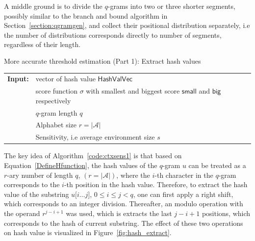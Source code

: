 \documentclass[twoside,a4paper,bsc]{master}
\newcommand{\Qgram}[1]{\(#1\)-gram}
\newcommand{\Append}[0]{\mathsf{append}}
\newcommand{\HashValue}[0]{\mathsf{HashValue}}
\newcommand{\HashValVec}[0]{\mathsf{HashValVec}}
\newcommand{\Small}[0]{\mathsf{small}}
\newcommand{\Biggg}[0]{\mathsf{big}}
\newcommand{\DivFactors}[0]{\mathsf{divFactors}}
\newcommand{\DivFactor}[0]{\mathsf{divFactor}}
\newcommand{\ModFactors}[0]{\mathsf{modFactors}}
\newcommand{\Subchar}[2]{#1\lbrack #2\rbrack}
\newcommand{\Alpha}[0]{\mathcal{A}}
\newcommand{\Qsplit}{\mathsf{QS}}
\begin{document}
A middle ground is to divide the \Qgram{q}s
into two or three shorter segments, possibly similar to the branch and
bound
algorithm in Section~\ref{section:qgramgen}, and collect their positional
distribution separately, i.e the number of distributions corresponds
directly to
number of segments, regardless of their length.

\begin{algorithm}[t]
\caption{More accurate threshold estimation (Part 1): Extract hash values}
\label{code:ctxsens1}
\begin{tabular}{@{}l@{~}l}
\textbf{Input:}&vector of hash value \(\HashValVec\)\\
&score function \(\sigma\) with smallest and biggest score \(\Small\) and
\(\Biggg\)
respectively\\
&\Qgram{q} length \(q\)\\
&Alphabet size \(r = |\Alpha|\)\\
&Sensitivity, i.e average environment size \(s\)
\end{tabular}
\begin{algorithmic}
\State \(\ModFactors \gets []\)
\State \(\DivFactors \gets []\)
\For{\(i\in[0,|\Qsplit(q)|)\)}
\State \(\ModFactors.\Append(r^{\Qsplit(q)[i]})\)
\State \(\DivFactor \gets 1\)
\For{\(j\in[i+1,|\Qsplit(q)|)\)}
\State \(\DivFactor\text{ \(\cdot\)= }\Qsplit(q)[j]\)
\EndFor
\State \(\DivFactors.\Append(\DivFactor)\)
\EndFor
\State \(d \gets []\)
\For{\(i\in[0,|\Qsplit(q)|)\)}\Comment{Extract hash values of segments}
\State \(d.\Append([0] \times \ModFactors[i])\)
\EndFor
\For{\(\HashValue\in\HashValVec\)}
\For{\(i\in[0,|\Qsplit(q)|)\)}
\State \(\HashValue_i \gets (\frac{\HashValue}{\DivFactors[i]}) \%
\ModFactors[i]\)\Comment{Integer division}
\State \(d[i][\HashValue_i]\text{ += }1\)
\EndFor
\EndFor
\end{algorithmic}
\end{algorithm}

The key idea of Algorithm~\ref{code:ctxsens1} is that based on
Equation~\ref{DefineHfunction}, the hash values of the \Qgram{q} \(u\) can
be
treated as a \(r\)-ary number of length \(q\), \((r=|\Alpha|)\), where the
\(i\)-th character in the \Qgram{q} corresponds to the \(i\)-th position in
the hash value. Therefore, to extract the hash value of the substring
\(\Subchar{u}{i\ldots j}\), \(0 \leq i \leq j < q\), one can first apply a
right shift, which corresponds to an integer division. Thereafter, an
modulo
operation with the operand \(r^{j-i+1}\) was used, which is extracts the
last
\(j-i+1\) positions, which corresponds to the hash of current substring. The 
effect of these two operations on hash value is visualized in 
Figure~\ref{fig:hash_extract}. 
\end{document}
